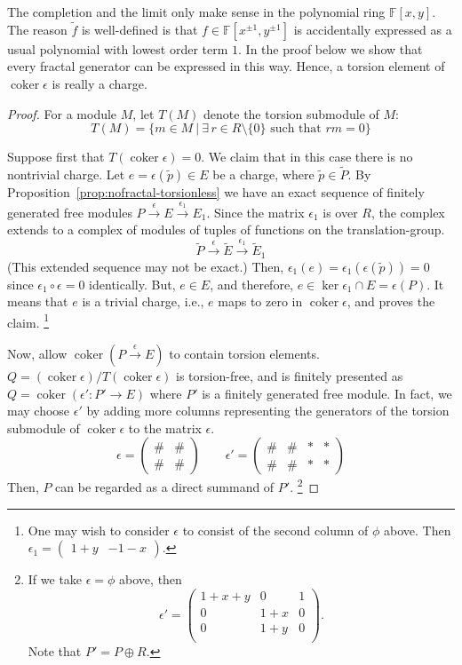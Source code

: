 \documentclass[letterpaper,12pt]{amsart}
\theoremstyle{definition} \newtheorem{defn}{Definition}
\theoremstyle{definition} \newtheorem{rem}{Remark}
\theoremstyle{definition} \newtheorem{example}{Example}
\newcommand{\coker}{\mathop{\mathrm{coker}}}
\newcommand{\FF}{\mathbb{F}}
\begin{document}
The completion and the limit only make sense in the polynomial ring $\FF[x,y]$.
The reason $\tilde f$ is well-defined is that $f \in \FF[x^{\pm 1},y^{\pm 1}]$ is accidentally expressed
as a usual polynomial with lowest order term $1$.
In the proof below we show that every fractal generator can be expressed in this way.
Hence, a torsion element of $\coker \epsilon$ is really a charge.

\begin{proof}
For a module $M$, let $T(M)$ denote the torsion submodule of $M$:
\[
 T(M) = \{ m \in M \ |\  \exists \, r \in R \setminus \{0\} \text{ such that } rm = 0 \}
\]

Suppose first that $T(\coker \epsilon) = 0$.
We claim that in this case there is no nontrivial charge.
Let $e = \epsilon( \tilde p ) \in E$ be a charge, where $\tilde p \in \tilde P$.
By Proposition~\ref{prop:nofractal-torsionless}
we have an exact sequence of finitely generated free modules
$ P \xrightarrow{\epsilon} E \xrightarrow{\epsilon_1} E_1$.
Since the matrix $\epsilon_1$ is over $R$,
the complex extends to a complex of modules of tuples of functions on the translation-group.
\[
 \tilde P \xrightarrow{\epsilon} \tilde E \xrightarrow{\epsilon_1} \tilde E_1
\]
(This extended sequence may not be exact.)
Then, $\epsilon_1(e) = \epsilon_1( \epsilon( \tilde p ) ) = 0$
since $\epsilon_1 \circ \epsilon = 0$ identically.
But, $e \in E$, and therefore, $e \in \ker \epsilon_1 \cap E = \epsilon(P)$.
It means that $e$ is a trivial charge, i.e., $e$ maps to zero in $\coker \epsilon$,
and proves the claim.%
\footnote{
One may wish to consider $\epsilon$ to consist of the second column of $\phi$ above.
Then $\epsilon_1 = \begin{pmatrix} 1+y & -1-x \end{pmatrix}$.
}

Now, allow $\coker (P \xrightarrow{\epsilon} E)$ to contain torsion elements.
$Q = (\coker \epsilon) / T(\coker \epsilon)$ is torsion-free,
and is finitely presented as $Q = \coker( \epsilon' : P' \to E )$
where $P'$ is a finitely generated free module.
In fact, we may choose $\epsilon'$ by adding more columns representing the generators of
the torsion submodule of $\coker \epsilon$ to the matrix $\epsilon$.
\[
 \epsilon = \begin{pmatrix} \# & \# \\ \# & \# \end{pmatrix} \quad \quad
 \epsilon'= \begin{pmatrix} \# & \# & * & * \\ \# & \# & * & * \end{pmatrix}
\]
Then, $P$ can be regarded as a direct summand of $P'$.%
\footnote{
If we take $\epsilon = \phi$ above,
then
\[
 \epsilon' =  \begin{pmatrix}
  1+x+y & 0   & 1 \\
     0  & 1+x & 0 \\
     0  & 1+y & 0 \\
 \end{pmatrix}.
\]
Note that $P' = P \oplus R$.
}


\end{proof}
\end{document}
